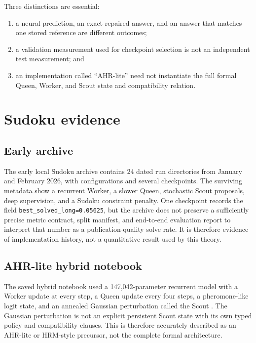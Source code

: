 \documentclass[11pt,oneside]{book}
\theoremstyle{remark}
\begin{document}
Three distinctions are essential:
\begin{enumerate}
  \item a neural prediction, an exact repaired answer, and an answer that
  matches one stored reference are different outcomes;
  \item a validation measurement used for checkpoint selection is not an
  independent test measurement; and
  \item an implementation called ``AHR-lite'' need not instantiate the full
  formal Queen, Worker, and Scout state and compatibility relation.
\end{enumerate}

\section{Sudoku evidence}

\subsection{Early archive}

The early local Sudoku archive contains 24 dated run directories from January
and February 2026, with configurations and several checkpoints. The surviving
metadata show a recurrent Worker, a slower Queen, stochastic Scout proposals,
deep supervision, and a Sudoku constraint penalty. One checkpoint records the
field \texttt{best\_solved\_long=0.05625}, but the archive does not preserve a
sufficiently precise metric contract, split manifest, and end-to-end
evaluation report to interpret that number as a publication-quality solve
rate. It is therefore evidence of implementation history, not a quantitative
result used by this theory.

\subsection{AHR-lite hybrid notebook}

The saved hybrid notebook used a 147,042-parameter recurrent model with a
Worker update at every step, a Queen update every four steps, a pheromone-like
logit state, and an annealed Gaussian perturbation called the Scout
\cite{FalkenburgSudokuNotebooks2026,FalkenburgSudokuLocalBundle2026}. The
Gaussian perturbation is not an explicit persistent Scout state with its own
typed policy and compatibility clauses. This is therefore accurately described
as an AHR-lite or HRM-style precursor, not the complete formal architecture.
\end{document}
